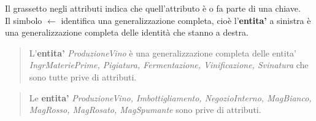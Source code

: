 Il grassetto negli attributi indica che quell'attributo è o fa parte di una chiave. \\
Il simbolo $\gets$ identifica una generalizzazione completa, cioè l'\textbf{entita'} a sinistra è una generalizzazione completa delle identità che stanno a destra.

\begin{verse}
	L'\textbf{entita'} \emph{ProduzioneVino} è una generalizzazione completa delle entita' \emph{IngrMateriePrime, Pigiatura, Fermentazione, Vinificazione, Svinatura} che sono tutte prive di attributi.
\end{verse}
\begin{verse}
	Le \textbf{entita'} \emph{ProduzioneVino, Imbottigliamento, NegozioInterno, MagBianco, MagRosso, MagRosato, MagSpumante} sono prive di attributi.
\end{verse}

